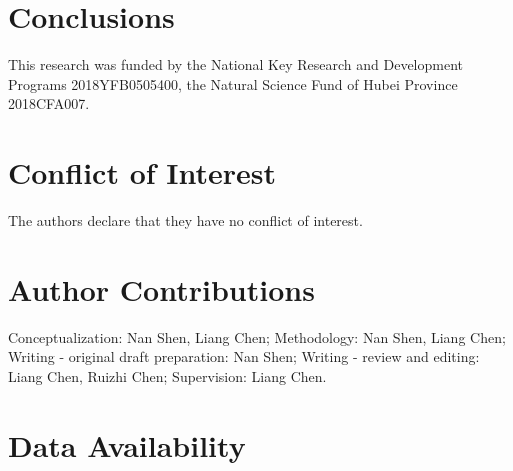 \documentclass{svjour3}                     %
\begin{document}
\section{Conclusions}
\label{concl}

\begin{acknowledgements}
This research was funded by the National Key Research and Development Programs 2018YFB0505400, the Natural Science Fund of Hubei Province 2018CFA007.
\end{acknowledgements}

%
\section*{Conflict of Interest}
The authors declare that they have no conflict of interest.
\section*{Author Contributions}
Conceptualization: Nan Shen, Liang Chen; Methodology: Nan Shen, Liang Chen; Writing - original draft preparation: Nan Shen; Writing - review and editing: Liang Chen, Ruizhi Chen; Supervision: Liang Chen.
 \section*{Data Availability}



\end{document}
